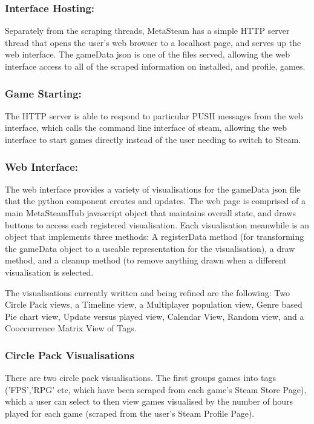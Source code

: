 \documentclass[11pt]{article}
\begin{document}
\subsubsection*{Interface Hosting:}
Separately from the scraping threads, MetaSteam has a simple HTTP server thread that opens the user's web browser to a localhost page, and serves up the web interface. The gameData json is one of the files served, allowing the web interface access to all of the scraped information on installed, and profile, games.

\subsubsection*{Game Starting:}
The HTTP server is able to respond to particular PUSH messages from the web interface, which calls the command line interface of steam, allowing the web interface to start games directly instead of the user needing to switch to Steam.

\subsubsection*{Web Interface:}
The web interface provides a variety of visualisations for the gameData json file that the python component creates and updates. The web page is comprised of a main MetaSteamHub javascript object that maintains overall state, and draws buttons to access each registered visualisation. Each visualisation meanwhile is an object that implements three methods: A registerData method (for transforming the gameData object to a useable representation for the visualisation), a draw method, and a cleanup method (to remove anything drawn when a different visualisation is selected.

The visualisations currently written and being refined are the following: Two Circle Pack views, a Timeline view, a Multiplayer population view, Genre based Pie chart view, Update versus played view, Calendar View, Random view, and a Cooccurrence Matrix View of Tags.

\subsubsection*{Circle Pack Visualisations}
There are two circle pack visualisations. The first groups games into tags ('FPS','RPG' etc, which have been scraped from each game's Steam Store Page), which a user can select to then view games visualised by the number of hours played for each game (scraped from the user's Steam Profile Page).
\end{document}
